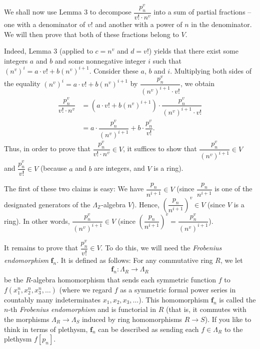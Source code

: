 \documentclass[10pt,a4paper]{article}
\begin{document}
We shall now use Lemma 3 to decompose $\dfrac{p_n^v }{v!\cdot n^v }$ into
a sum of partial fractions -- one with a denominator of $v!$ and another with
a power of $n$ in the denominator. We will then prove that both of these
fractions belong to $V$.




Indeed, Lemma 3 (applied to $c=n^v $ and $d=v!$) yields that there exist some
integers $a$ and $b$ and some nonnegative integer $i$ such that $\left(
n^v \right)  ^i =a\cdot v!+b\left(  n^v \right)  ^{i+1}$. Consider these
$a$, $b$ and $i$. Multiplying both sides of the equality $\left(
n^v \right)  ^i =a\cdot v!+b\left(  n^v \right)  ^{i+1}$ by $\dfrac
{p_n^v }{\left(  n^v \right)  ^{i+1}\cdot v!}$, we obtain
\begin{align}
\dfrac{p_n^v }{v!\cdot n^v }
&=\left(a\cdot v!+b\left(  n^v \right)
^{i+1}\right) \cdot \dfrac{p_n^v }{\left(  n^v \right)  ^{i+1}\cdot v!} \\
&=a\cdot\dfrac{p_n^v }{\left(
n^v \right)  ^{i+1}}+b\cdot\dfrac{p_n^v }{v!}
.
\label{darij1.pf.t2.c2.parfrac}
\tag{3}
\end{align}
Thus, in order to prove that $\dfrac{p_n^v }{v!\cdot n^v }\in V$, it
suffices to show that $\dfrac{p_n^v }{\left(  n^v \right)  ^{i+1}}\in V$
and $\dfrac{p_n^v }{v!}\in V$ (because $a$ and $b$ are integers, and $V$ is
a ring).




The first of these two claims is easy: We have $\dfrac{p_n}{n^{i+1}}\in V$
(since $\dfrac{p_n}{n^{i+1}}$ is one of the designated generators of the
$\Lambda_{\mathbb{Z}}$-algebra $V$). Hence, $\left(  \dfrac{p_n}{n^{i+1}
}\right)  ^v \in V$ (since $V$ is a ring). In other words, $\dfrac{p_n^v 
}{\left(  n^v \right)  ^{i+1}}\in V$ (since $\left(  \dfrac{p_n}{n^{i+1}
}\right)  ^v =\dfrac{p_n^v }{\left(  n^v \right)  ^{i+1}}$).




It remains to prove that $\dfrac{p_n^v }{v!}\in V$. To do this, we will
need the \emph{Frobenius endomorphism} $\mathbf{f}_n$. It is defined as follows:
For any commutative ring $R$, we let
\begin{align*}
\mathbf{f}_n:\Lambda_{R}\rightarrow\Lambda_{R}
\end{align*}
be the $R$-algebra homomorphism that sends each symmetric function $f$ to
$f\left(  x_{1}^{n},x_{2}^{n},x_{3}^{n},\ldots\right)  $ (where we regard $f$
as a symmetric formal power series in countably many indeterminates $x_{1},x_{2}
,x_{3},\ldots$). This homomorphism $\mathbf{f}_n$ is called the $n$-th
\emph{Frobenius endomorphism} and is functorial in $R$ (that is, it commutes with
the morphisms $\Lambda_{R}\rightarrow\Lambda_{S}$ induced by ring
homomorphisms $R\rightarrow S$). If you like to think in terms of plethysm,
$\mathbf{f}_n$ can be described as sending each $f\in\Lambda_{R}$ to the
plethysm $f\left[  p_n\right]  $.
\end{document}
